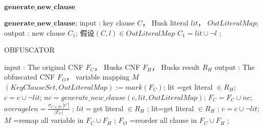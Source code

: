 \begin{algorithm}[t]
\caption{$\mathbf{generate\_new\_clause}$}
\begin{algorithmic}[1]
\STATE $\mathbf{generate\_new\_clause}$;
\STATE input : key clause $C$， Husk literal $lit$， $OutLiteralMap$;
\STATE output : new clause $C_1$;
\STATE 假设$(C,l)\in OutLiteralMap$
\STATE $C_1= lit \cup \neg l$ ;\label{3:rule2}
\end{algorithmic}
\end{algorithm}


\begin{algorithm}[t]
\caption{OBFUSCATOR}
\label{3:algo_obs}
\begin{algorithmic}[1]
\STATE input : The original CNF $F_C$， Husks CNF $F_H$， Husks result $R_H$
\STATE output : The obfuscated CNF $F_O$， variable mapping $M$
\STATE $(KeyClauseSet,OutLiteralMap):=mark(F_C)$;\label{3:mark}
 \label{3:keyclause}
\STATE     lit =get literal $ \in R_H$;
\STATE     $c=c \cup \neg lit$;\label{3:rule1}
\STATE     $nc=generate\_new\_clause(c,lit,OutLiteralMap)$;\label{3:gennewclause}
 \STATE    $F_C=F_C \cup nc$;\label{3:blendclause1}
\ENDIF
\ENDFOR
{}
\STATE $averagelen=\frac{\sigma _{c'\in F_C}|c'|}{|F_C|}$ ;
\STATE $lit=$get literal $\in R_H$ ;
\STATE lit=get literal $ \in R_H $ ;
\ENDWHILE
\STATE $c=c \cup \neg lit$;\label{3:rule1-2}
\ENDWHILE
\STATE $M$ =remap all variable in $F_C\cup F_H$ ;\label{3:MV}
\STATE $F_O$ =reorder all clause in $F_C\cup F_H$ ; \label{3:blendclause2}
\ENDFOR
\end{algorithmic}
\end{algorithm}



%



